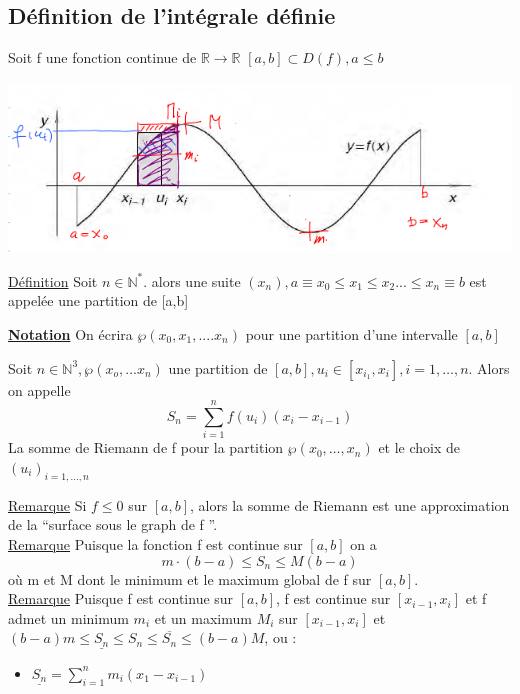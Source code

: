 \documentclass[12pt,a4paper]{article}
\newcommand{\somme}[2]{\ensuremath{\sum\limits_{#2}^{#1}}}
\newcommand{\evid}[1]{\textbf{\underline{#1}}}
\newcommand{\R}{\ensuremath{\mathbb{R}} }
\newcommand{\N}{\ensuremath{\mathbb{N}} }
\newcommand{\rtor}{\ensuremath{\R \to \R} }
\newcommand{\Remarque}{\underline{Remarque} }
\newcommand{\Definition}{\underline{Définition} }
\begin{document}
{\subsection{Définition de l'intégrale définie}
Soit f une fonction continue de \rtor $[a,b]\subset D(f), a\leq b$\\
\begin{center}
\includegraphics[scale=0.8]{illustrations_analyse/integrale}
\end{center}
\begin{boite}
	\Definition Soit $n \in \N^*$. alors une suite $(x_n), a \equiv x_0 \leq x_1 \leq x_2 ... \leq x_n \equiv b$ est appelée une partition de [a,b]
\end{boite}
\evid{Notation} On écrira $\wp (x_0,x_1,....x_n)$ pour une partition d'une intervalle $[a,b]$
\begin{boite}
	Soit $n \in \N^3, \wp(x_o,...x_n)$ une partition de $[a,b], u_i \in [x_{i_1},x_i], i = 1,\ldots,n$. Alors on appelle
	\begin{equation}
		S_n = \somme{n}{i=1}{f(u_i)(x_i-x_{i-1})}
	\end{equation}	 
	La somme de Riemann de f pour la partition $\wp(x_0,\ldots, x_n)$ et le choix de $(u_i)_{i=1,\ldots,n}$
\end{boite}
\Remarque Si $f \leq 0$ sur $[a,b]$, alors la somme de Riemann est une approximation de la ``surface sous le graph de f ''.\\
\Remarque Puisque la fonction f est continue sur $[a,b]$ on a 
\begin{equation}
	m\cdot(b-a) \leq S_n \leq M(b-a)
\end{equation}
où m et M dont le minimum et le maximum global de f sur $[a,b]$.\\
\Remarque Puisque f est continue sur $[a,b]$, f est continue sur $[x_{i-1},x_i]$ et f admet un minimum $m_i$ et un maximum $M_i$ sur $[x_{i-1},x_i]$ et \\
$(b-a)m \leq \underline{S_n} \leq S_n \leq \overline{S_n} \leq (b-a)M$, ou :
\begin{itemize}
	\item $\underline{S_n} = \somme{n}{i=1}{m_i(x_1-x_{i-1})}$

\end{itemize}}
\end{document}
